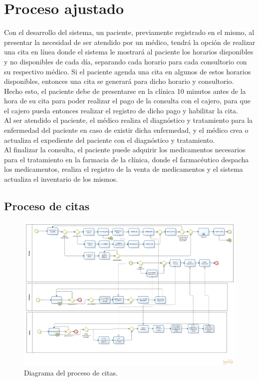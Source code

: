 \section{Proceso ajustado}


Con el desarrollo del sistema, un paciente, previamente registrado en el mismo, al presentar la necesidad de ser atendido por un médico, tendrá la opción de realizar una cita en línea donde el sistema le mostrará al paciente los horarios disponibles y no disponibles de cada día, separando cada horario para cada consultorio con su respectivo médico. Si el paciente agenda una cita en algunos de estos horarios disponibles, entonces una cita se generará para dicho horario y consultorio.\\ 

Hecho esto, el paciente debe de presentarse en la clínica 10 minutos antes de la hora de su cita para poder realizar el pago de la consulta con el cajero, para que el cajero pueda entonces realizar el registro de dicho pago y habilitar la cita.\\

Al ser atendido el paciente, el médico realiza el diagnóstico y tratamiento para la enfermedad del paciente en caso de existir dicha enfermedad, y el médico crea o actualiza el expediente del paciente con el diagnóstico y tratamiento.\\

Al finalizar la consulta, el paciente puede adquirir los medicamentos necesarios para el tratamiento en la farmacia de la clínica, donde el farmacéutico despacha los medicamentos, realiza el registro de la venta de medicamentos y el sistema actualiza el inventario de los mismos.\\

\subsection{Proceso de citas}
\begin{figure}[htbp!]
		\centering
			\includegraphics[width=1\textwidth]{images/Proceso_citas}
		\caption{Diagrama del proceso de citas.}
	\end{figure}
    
